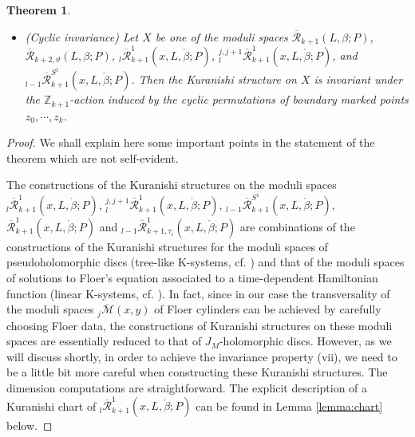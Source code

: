\documentclass[a4paper]{article}
\newtheorem{theorem}{Theorem}
\numberwithin{equation}{section}
\begin{document}
\begin{theorem}
\begin{itemize}
    \item[(vii)] (Cyclic invariance) Let $X$ be one of the moduli spaces $\overline{\mathcal{R}}_{k+1}(L,\beta;P)$, $\overline{\mathcal{R}}_{k+2,\vartheta}(L,\beta;P)$, ${}_l\overline{\mathcal{R}}_{k+1}^1(x,L,\ring{\beta};P)$, ${}_l^{j,j+1}\overline{\mathcal{R}}_{k+1}^1(x,L,\ring{\beta};P)$, and ${}_{l-1}\overline{\mathcal{R}}_{k+1}^{S^1}(x,L,\ring{\beta};P)$. Then the Kuranishi structure on $X$ is invariant under the $\mathbb{Z}_{k+1}$-action induced by the cyclic permutations of boundary marked points $z_0,\cdots,z_k$.
\end{itemize}
\end{theorem}

\begin{proof}
We shall explain here some important points in the statement of the theorem which are not self-evident.

The constructions of the Kuranishi structures on the moduli spaces ${}_l\overline{\mathcal{R}}_{k+1}^1(x,L,\ring{\beta};P)$, ${}_l^{j,j+1}\overline{\mathcal{R}}_{k+1}^1(x,L,\ring{\beta};P)$, ${}_{l-1}\overline{\mathcal{R}}_{k+1}^{S^1}(x,L,\ring{\beta};P)$, $\overline{\mathcal{R}}_{k+1}^1(x,L,\ring{\beta};P)$ and ${}_{l-1}\overline{\mathcal{R}}^1_{k+1,\tau_i}(x,L,\ring{\beta};P)$ are combinations of the constructions of the Kuranishi structures for the moduli spaces of pseudoholomorphic discs (tree-like K-systems, cf. \cite{fooo5,fooo6}) and that of the moduli spaces of solutions to Floer's equation associated to a time-dependent Hamiltonian function (linear K-systems, cf. \cite{fooo4,fon}). In fact, since in our case the transversality of the moduli spaces ${}_j\overline{\mathcal{M}}(x,y)$ of Floer cylinders can be achieved by carefully choosing Floer data, the constructions of Kuranishi structures on these moduli spaces are essentially reduced to that of $J_M$-holomorphic discs. However, as we will discuss shortly, in order to achieve the invariance property (vii), we need to be a little bit more careful when constructing these Kuranishi structures. The dimension computations are straightforward. The explicit description of a Kuranishi chart of ${}_l\overline{\mathcal{R}}_{k+1}^1(x,L,\ring{\beta};P)$ can be found in Lemma \ref{lemma:chart} below.


\end{proof}
\end{document}
